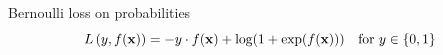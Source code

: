 \documentclass[11pt,compress,t,notes=noshow, xcolor=table]{beamer}
\begin{document}
\begin{vbframe}{Bernoulli loss on probabilities}
$$L\left(y, f(\mathbf{x})\right) = - y \cdot f(\mathbf{x}) + \log(1 + \exp(f(\mathbf{x}))) \quad \text{for } y \in \{0, 1\}$$
\lz
\begin{center}
\begin{figure}
  \\
\end{figure}
\end{center}

\end{vbframe}
\end{document}
